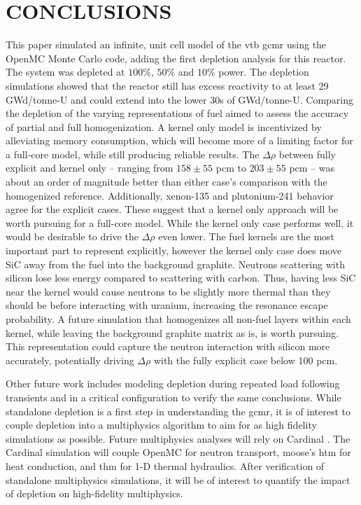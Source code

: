 \documentclass[letterpaper]{physor2024}
\begin{document}
\section{CONCLUSIONS}\label{sec:conclusions}
This paper simulated an infinite, unit cell model of the \gls{vtb} \gls{gcmr} using the OpenMC Monte Carlo code, adding the first depletion analysis for this reactor. The system was depleted at $100\%$, $50\%$ and $10\%$ power. The depletion simulations showed that the reactor still has excess reactivity to at least 29 GWd/tonne-U and could extend into the lower 30s of GWd/tonne-U. Comparing the depletion of the varying representations of fuel aimed to assess the accuracy of partial and full homogenization. A kernel only model is incentivized by alleviating memory consumption, which will become more of a limiting factor for a full-core model, while still producing reliable results. The $\Delta \rho$ between fully explicit and kernel only -- ranging from $158\pm55$ \gls{pcm} to $203\pm55$ \gls{pcm} -- was about an order of magnitude better than either case's comparison with the homogenized reference. Additionally, xenon-135 and plutonium-241 behavior agree for the explicit cases. These suggest that a kernel only approach will be worth pursuing for a full-core model. While the kernel only case performs well, it would be desirable to drive the $\Delta \rho$ even lower. The fuel kernels are the most important part to represent explicitly, however the kernel only case does move SiC away from the fuel into the background graphite. Neutrons scattering with silicon lose less energy compared to scattering with carbon. Thus, having less SiC near the kernel would cause neutrons to be slightly more thermal than they should be before interacting with uranium, increasing the resonance escape probability.
A future simulation that homogenizes all non-fuel layers within each kernel, while leaving the background graphite matrix as is, is worth pursuing. This representation could capture the neutron interaction with silicon more accurately, potentially driving $\Delta \rho$ with the fully explicit case below 100 \gls{pcm}.

Other future work includes modeling depletion during repeated load following transients and in a critical configuration to verify the same conclusions. While standalone depletion is a first step in understanding the \gls{gcmr}, it is of interest to couple depletion into a multiphysics algorithm to aim for as high fidelity simulations as possible. Future multiphysics analyses will rely on Cardinal \cite{novak2022-cardinal}. The Cardinal simulation will couple OpenMC for neutron transport, \gls{moose}'s \gls{htm} for heat conduction, and \gls{thm} for 1-D thermal hydraulics. After verification of standalone multiphysics simulations, it will be of interest to quantify the impact of depletion on high-fidelity multiphysics.
\end{document}

